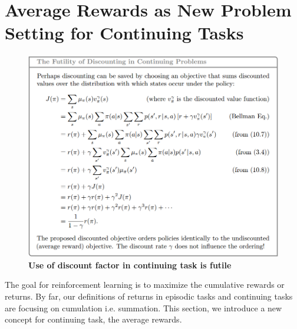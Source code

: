 \documentclass[11pt]{article}
\begin{document}
\section{Average Rewards as New Problem Setting for Continuing Tasks}
\begin{figure}
\begin{minipage}[t]{1\linewidth}
  \centering
  \centerline{\includegraphics[scale = 0.45]{discount_count_problem.png}}
\end{minipage}
\caption{\footnotesize{\textbf{Use of discount factor in continuing task is futile}}}
\label{fig: discount_count_problem}
\end{figure}
The goal for reinforcement learning is to maximize the cumulative rewards or returns. By far, our definitions of returns in episodic tasks and continuing tasks are focusing on cumulation i.e. summation. This section, we introduce a new concept for continuing task, the average rewards.
\end{document}
